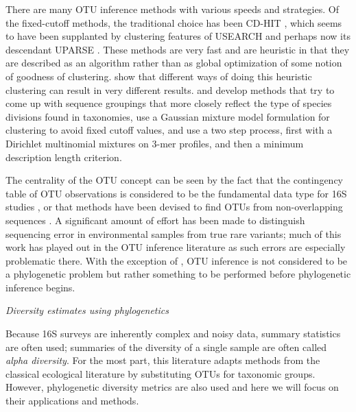 \documentclass{amsart}
\renewcommand{\subsection}[1]{%
\bigskip
\begin{center}
\begin{large}
\normalfont\itshape #1
\end{large}
\end{center}}
\begin{document}
There are many OTU inference methods with various speeds and strategies.
Of the fixed-cutoff methods, the traditional choice has been CD-HIT \citep{li2006cdhit}, which seems to have been supplanted by clustering features of USEARCH \citep{edgar2010usearch} and perhaps now its descendant UPARSE \citep{edgar2013uparse}.
These methods are very fast and are heuristic in that they are described as an algorithm rather than as global optimization of some notion of goodness of clustering.
\citet{white2010alignment} show that different ways of doing this heuristic clustering can result in very different results.
\citet{navlakha2009finding} and \citet{WYS13} develop methods that try to come up with sequence groupings that more closely reflect the type of species divisions found in taxonomies,
\citet{hao2011clustering} use a Gaussian mixture model formulation for clustering to avoid fixed cutoff values,
and \cite{CWC12} use a two step process, first with a Dirichlet multinomial mixtures on 3-mer profiles, and then a minimum description length criterion.

The centrality of the OTU concept can be seen by the fact that the contingency table of OTU observations is considered to be the fundamental data type for 16S studies \citep{mcdonald2012biological}, or that methods have been devised to find OTUs from non-overlapping sequences \citep{sharpton2011phylotu}.
A significant amount of effort has been made to distinguish sequencing error in environmental samples from true rare variants; much of this work has played out in the OTU inference literature \citep{quince2009accurate,quince2011removing,bragg2012fast,edgar2013uparse} as such errors are especially problematic there.
With the exception of \citet{sharpton2011phylotu}, OTU inference is not considered to be a phylogenetic problem but rather something to be performed before phylogenetic inference begins.

\subsection{Diversity estimates using phylogenetics}

Because 16S surveys are inherently complex and noisy data, summary statistics are often used; summaries of the diversity of a single sample are often called \emph{alpha diversity}.
For the most part, this literature adapts methods from the classical ecological literature by substituting OTUs for taxonomic groups.
However, phylogenetic diversity metrics are also used and here we will focus on their applications and methods.
\end{document}
